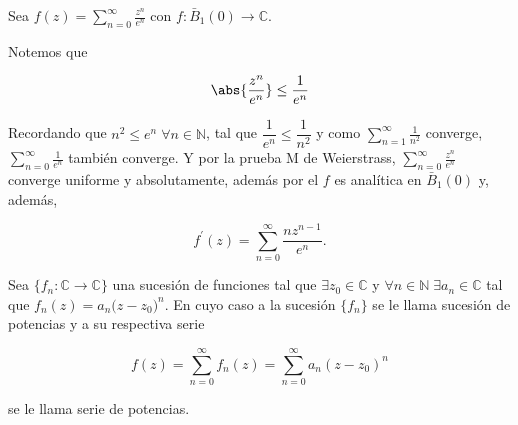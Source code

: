 \documentclass[../main.tex]{subfiles}
\begin{document}
\begin{example}
    Sea \(f(z) = \sum_{n = 0}^{\infty}\tfrac{z^{n}}{e^{n}}\) con \(f \colon
        \bar{B}_{1}(0)
    \to \mathbb{C}\).

    Notemos que

    \begin{equation*}
        \abs{\dfrac{z^{n}}{e^{n}}} \leq \dfrac{1}{e^{n}}
    \end{equation*}

    Recordando que \(n^{2} \leq e^{n}\; \forall n\in \mathbb{N}\), tal que
    \(\dfrac{1}{e^{n}} \leq \dfrac{1}{n^{2}}\) y como \(\sum_{n =
    1}^{\infty}\tfrac{1}{n^{2}}\) converge, \(\sum_{n = 0}^{\infty}\tfrac{1}{e^{n}}\)
    también converge.
    Y por la prueba M de Weierstrass, \(\sum_{n =
    0}^{\infty}\tfrac{z^{n}}{e^{n}}\) converge
    uniforme y absolutamente, además por el 
    \(f\) es analítica en \(\bar{B}_{1}(0)\) y, además,

    \begin{equation*}
        f^{\prime}(z) = \sum_{n = 0}^{\infty}\dfrac{n z^{n - 1}}{e^{n}}.
    \end{equation*}
\end{example}

\begin{definition}
    Sea \(\{f_{n} \colon \mathbb{C} \to \mathbb{C}\}\) una sucesión de funciones tal que
    \(\exists z_{0}\in \mathbb{C}\) y \(\forall n\in \mathbb{N}\; \exists a_{n}\in
    \mathbb{C}\) tal que \(f_{n}(z) = a_{n}\bigl(z - z_{0}\bigr)^{n}\). En cuyo caso a
    la sucesión \(\{f_{n}\}\) se le llama sucesión de potencias y a su respectiva serie

    \begin{equation*}
        f(z) = \sum_{n = 0}^{\infty}f_{n}(z) = \sum_{n = 0}^{\infty}a_{n}(z - z_{0})^{n}
    \end{equation*}

    se le llama serie de potencias.
\end{definition}
\end{document}
